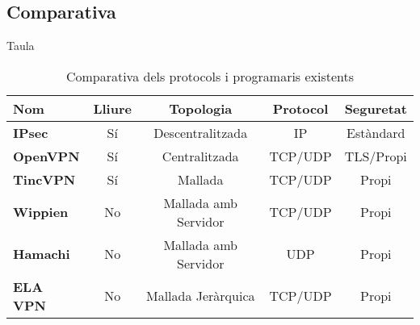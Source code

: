 \subsection{Comparativa}
    \begin{frame}{Taula}
\begin{table}[htb]
\begin{center}
\begin{tabular}{|l|c|c|c|c|}
\hline
Nom & Lliure & Topologia & Protocol & Seguretat \\ \hline \hline
\bf IPsec & Sí & Descentralitzada & IP & Estàndard \\ \hline
\bf OpenVPN & Sí & Centralitzada & TCP/UDP & TLS/Propi \\ \hline
\bf TincVPN & Sí & Mallada & TCP/UDP & Propi \\ \hline
\bf Wippien & No & Mallada amb Servidor & TCP/UDP & Propi \\ \hline
\bf Hamachi & No & Mallada amb Servidor & UDP & Propi \\ \hline
\bf ELA VPN & No & Mallada Jeràrquica & TCP/UDP & Propi \\ \hline
\end{tabular}
\end{center}
\begin{center}
\caption{Comparativa dels protocols i programaris existents}
\end{center}
\end{table}
    \end{frame}
